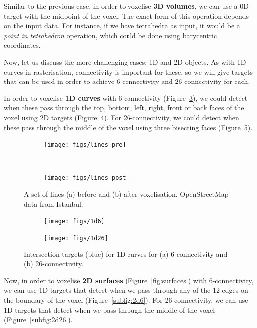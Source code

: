 Similar to the previous case, in order to voxelise \textbf{3D volumes}, we can use a 0D target with the midpoint of the voxel.
The exact form of this operation depends on the input data.
For instance, if we have tetrahedra as input, it would be a \emph{point in tetrahedron} operation, which could be done using barycentric coordinates.

Now, let us discuss the more challenging cases: 1D and 2D objects.
As with 1D curves in rasterisation, connectivity is important for these, so we will give targets that can be used in order to achieve 6-connectivity and 26-connectivity for each.

In order to voxelise \textbf{1D curves} with 6-connectivity (Figure~\ref{fig:lines}), we could detect when these pass through the top, bottom, left, right, front or back faces of the voxel using 2D targets (Figure~\ref{subfig:1d6}).
For 26-connectivity, we could detect when these pass through the middle of the voxel using three bisecting faces (Figure~\ref{subfig:1d26}).

\begin{figure}
\centering
\begin{subfigure}[b]{\linewidth}
\texttt{[image: figs/lines-pre]}
\caption{}%
\label{subfig:lines-pre}
\end{subfigure}
\\
\begin{subfigure}[b]{\linewidth}
\texttt{[image: figs/lines-post]}
\caption{}%
\label{subfig:lines-post}
\end{subfigure}
\caption[A set of lines before and after voxelisation]{A set of lines (a) before and (b) after voxelisation. OpenStreetMap data from Istanbul.}%
\label{fig:lines}
\end{figure}

\begin{figure}
\centering
\begin{subfigure}[b]{0.45\linewidth}
\texttt{[image: figs/1d6]}
\caption{}%
\label{subfig:1d6}
\end{subfigure}
\quad
\begin{subfigure}[b]{0.45\linewidth}
\texttt{[image: figs/1d26]}
\caption{}%
\label{subfig:1d26}
\end{subfigure}
\caption[Intersection targets for 1D curves for 6-connectivity and 26-connectivity]{Intersection targets (blue) for 1D curves for (a) 6-connectivity and (b) 26-connectivity.}%
\label{fig:1d}
\end{figure}

Now, in order to voxelise \textbf{2D surfaces} (Figure~\ref{fig:surfaces}) with 6-connectivity, we can use 1D targets that detect when we pass through any of the 12 edges on the boundary of the voxel (Figure~\ref{subfig:2d6}).
For 26-connectivity, we can use 1D targets that detect when we pass through the middle of the voxel (Figure~\ref{subfig:2d26}).

